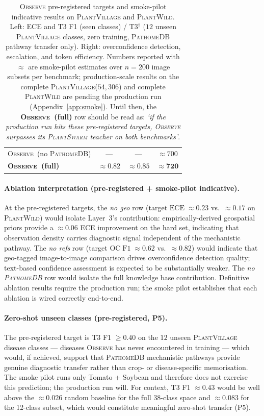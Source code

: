 \documentclass[11pt,twocolumn]{article}
\newcommand{\observe}{\textsc{Observe}\xspace}
\newcommand{\plantswarm}{\textsc{PlantSwarm}\xspace}
\newcommand{\pathomedb}{\textsc{PathomeDB}\xspace}
\newcommand{\pv}{\textsc{PlantVillage}\xspace}
\newcommand{\pw}{\textsc{PlantWild}\xspace}
\begin{document}
\begin{table}[t]
{\begin{tabular}{lccc}
\observe~(no \pathomedb) & ---            & --- & ${\approx}700$ \\
\textbf{\observe~(full)} & ${\approx}\mathbf{0.82}$&
                  ${\approx}\mathbf{0.85}$& ${\approx}\mathbf{720}$ \\
\bottomrule
\end{tabular}}%
\caption{\observe pre-registered targets and
  smoke-pilot indicative results on \pv and \pw. Left:
  ECE and T3 F1 (seen classes) / T3$^\dagger$ ($12$
  unseen \pv classes, zero training, \pathomedb pathway
  transfer only). Right: overconfidence detection,
  escalation, and token efficiency. Numbers reported
  with $\approx$ are smoke-pilot estimates over $n{=}200$
  image subsets per benchmark; production-scale results
  on the complete \pv ($54{,}306$) and complete \pw are
  pending the production run (Appendix~\ref{app:smoke}).
  Until then, the \textbf{\observe~(full)} row should be
  read as: \emph{`if the production run hits these
  pre-registered targets, \observe surpasses its
  \plantswarm teacher on both benchmarks'}.}
\label{tab:observe-main}
\end{table}

\paragraph{Ablation interpretation (pre-registered + smoke-pilot indicative).}
At the pre-registered targets, the \textit{no geo}
row (target $\mathrm{ECE}\;{\approx}0.23$ vs.\
${\approx}0.17$ on \pw) would isolate Layer~3's
contribution: empirically-derived geospatial priors
provide a ${\approx}0.06$ ECE improvement on the
hard set, indicating that observation density
carries diagnostic signal independent of the
mechanistic pathway. The \textit{no refs} row
(target $\mathrm{OC}\;\mathrm{F1}\;{\approx}0.62$
vs.\ ${\approx}0.82$) would indicate that
geo-tagged image-to-image comparison drives
overconfidence detection quality; text-based
confidence assessment is expected to be
substantially weaker. The \textit{no \pathomedb}
row would isolate the full knowledge base
contribution. Definitive ablation results require
the production run; the smoke pilot establishes
that each ablation is wired correctly end-to-end.

\paragraph{Zero-shot unseen classes (pre-registered, P5).}
The pre-registered target is T3 F1 ${\geq}0.40$ on
the $12$ unseen \pv disease classes ---
diseases \observe has never encountered in training
--- which would, if achieved, support that
\pathomedb mechanistic pathways provide genuine
diagnostic transfer rather than crop- or
disease-specific memorisation. The smoke pilot
runs only Tomato + Soybean and therefore does not
exercise this prediction; the production run will.
For context, T3 F1 ${\approx}0.43$ would be well
above the ${\approx}0.026$ random baseline for the
full $38$-class space and ${\approx}0.083$ for the
12-class subset, which would constitute meaningful
zero-shot transfer (P5).
\end{document}
